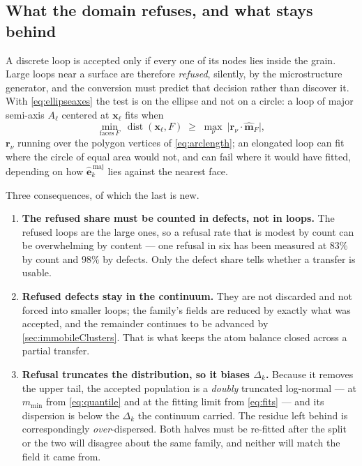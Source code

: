 \documentclass{article}
\begin{document}
\subsection{What the domain refuses, and what stays behind}
\label{sec:refusal}

A discrete loop is accepted only if every one of its nodes lies inside the
grain. Large loops near a surface are therefore \emph{refused}, silently, by the
microstructure generator, and the conversion must predict that decision rather
than discover it. With \cref{eq:ellipseaxes} the test is on the ellipse and not
on a circle: a loop of major semi-axis $A_\ell$ centered at $\bm x_\ell$ fits when
\begin{equation}
  \min_{\mathrm{faces}\ F}\ \operatorname{dist}(\bm x_\ell,F)
   \;\ge\;\max_\nu\ \bigl|\bm r_\nu\!\cdot\!\hat{\bm m}_F\bigr|,
  \label{eq:fits}
\end{equation}
$\bm r_\nu$ running over the polygon vertices of \cref{eq:arclength}; an
elongated loop can fit where the circle of equal area would not, and can fail
where it would have fitted, depending on how $\hat{\bm e}^{\,\mathrm{maj}}_k$
lies against the nearest face.

Three consequences, of which the last is new.

\begin{enumerate}
\item \textbf{The refused share must be counted in defects, not in loops.} The
      refused loops are the large ones, so a refusal rate that is modest by count
      can be overwhelming by content --- one refusal in six has been measured at
      $83\%$ by count and $98\%$ by defects. Only the defect share tells whether
      a transfer is usable.
\item \textbf{Refused defects stay in the continuum.} They are not discarded and
      not forced into smaller loops; the family's fields are reduced by exactly
      what was accepted, and the remainder continues to be advanced by
      \cref{sec:immobileClusters}. That is what keeps the atom balance closed
      across a partial transfer.
\item \textbf{Refusal truncates the distribution, so it biases $\Delta_k$.}
      Because it removes the upper tail, the accepted population is a
      \emph{doubly} truncated log-normal --- at $m_{\min}$ from
      \cref{eq:quantile} and at the fitting limit from \cref{eq:fits} --- and its
      dispersion is below the $\Delta_k$ the continuum carried. The residue left
      behind is correspondingly \emph{over}-dispersed. Both halves must be
      re-fitted after the split or the two will disagree about the same family,
      and neither will match the field it came from.
\end{enumerate}
\end{document}
